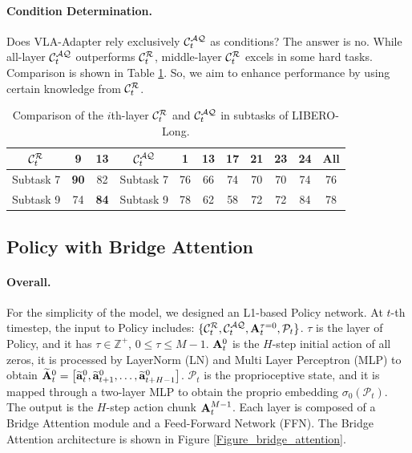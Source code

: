 \paragraph{Condition Determination.} Does VLA-Adapter rely exclusively $\mathcal{{\cal C}}_t^\mathcal{AQ}$ as conditions? The answer is no. While all-layer $\mathcal{{\cal C}}_t^\mathcal{AQ}$ outperforms $\mathcal{{\cal C}}_t^\mathcal{R}$, middle-layer $\mathcal{{\cal C}}_t^\mathcal{R}$ excels in some hard tasks. Comparison is shown in Table \ref{Table_condition_deter}. So, we aim to enhance performance by using certain knowledge from $\mathcal{{\cal C}}_t^\mathcal{R}$.

\begin{table}[!htbp]
	\centering
    \small
	\caption{Comparison of the $i$th-layer $\mathcal{{\cal C}}_t^\mathcal{R}$ and $\mathcal{{\cal C}}_t^\mathcal{AQ}$ in subtasks of LIBERO-Long.}\label{Table_condition_deter}%
	\begin{tabular}{c|cc|c|ccccccc}
		\toprule[1pt]
		$\mathcal{{\cal C}}_t^\mathcal{R}$ & 9     & 13   &$\mathcal{{\cal C}}_t^\mathcal{AQ}$& 1 & 13    & 17    & 21    & 23    & 24    & All \\
		\midrule[0.5pt]
		Subtask 7& \multicolumn{1}{c}{\textbf{90}} & \multicolumn{1}{c|}{82} & Subtask 7& 76    & 66    & 74    & 70    & 70    & 74    & 76 \\ 
		Subtask 9 &74&\textbf{84}&Subtask 9&78&62&58&72&72&84&78\\
		\bottomrule[1pt]
	\end{tabular}
\end{table}


\subsection{Policy with Bridge Attention}\label{Subsection_bridge_attention}

\paragraph{Overall.} For the simplicity of the model, we designed an L1-based Policy network. At $t$-th timestep, the input to Policy includes: $\{ \mathcal{{\cal C}}_t^\mathcal{R}, \mathcal{{\cal C}}_t^\mathcal{AQ}, {\bf A}^{\tau=0}_t , \mathcal{P}_t\} $. 
$\tau$ is the layer of Policy, and it has $\tau\in \mathbb{Z}^+$, $0 \leq \tau \leq M-1$. 
${\bf A}^{0}_t$ is the $H$-step initial action of all zeros, it is processed by LayerNorm (LN) and Multi Layer Perceptron (MLP) to obtain $\widetilde{\bf A}^0_t = \left[\widetilde{\bf a}^0_t, \widetilde{\bf a}^0_{t+1}, \dots, \widetilde{\bf a}^0_{t+H-1} \right]$. $\mathcal{P}_t$ is the proprioceptive state, and it is mapped through a two-layer MLP to obtain the proprio embedding ${\sigma _0}({\mathcal{P}_t})$. The output is the $H$-step action chunk ${\bf A}^{M-1}_t$. Each layer is composed of a Bridge Attention module and a Feed-Forward Network (FFN). The Bridge Attention architecture is shown in Figure \ref{Figure_bridge_attention}.

